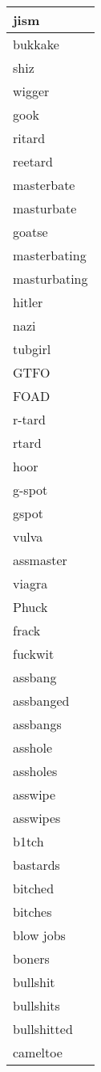 \begin{longtable}{|l|}
jism \\ \hline 
bukkake \\ \hline 
shiz \\ \hline 
wigger \\ \hline 
gook \\ \hline 
ritard \\ \hline 
reetard \\ \hline 
masterbate \\ \hline 
masturbate \\ \hline 
goatse \\ \hline 
masterbating \\ \hline 
masturbating \\ \hline 
hitler \\ \hline 
nazi \\ \hline 
tubgirl \\ \hline 
GTFO \\ \hline 
FOAD \\ \hline 
r-tard \\ \hline 
rtard \\ \hline 
hoor \\ \hline 
g-spot \\ \hline 
gspot \\ \hline 
vulva \\ \hline 
assmaster \\ \hline 
viagra \\ \hline 
Phuck \\ \hline 
frack \\ \hline 
fuckwit \\ \hline 
assbang \\ \hline 
assbanged \\ \hline 
assbangs \\ \hline 
asshole \\ \hline 
assholes \\ \hline 
asswipe \\ \hline 
asswipes \\ \hline 
b1tch \\ \hline 
bastards \\ \hline 
bitched \\ \hline 
bitches \\ \hline 
blow jobs \\ \hline 
boners \\ \hline 
bullshit \\ \hline 
bullshits \\ \hline 
bullshitted \\ \hline 
cameltoe \\ \hline 

\end{longtable}

